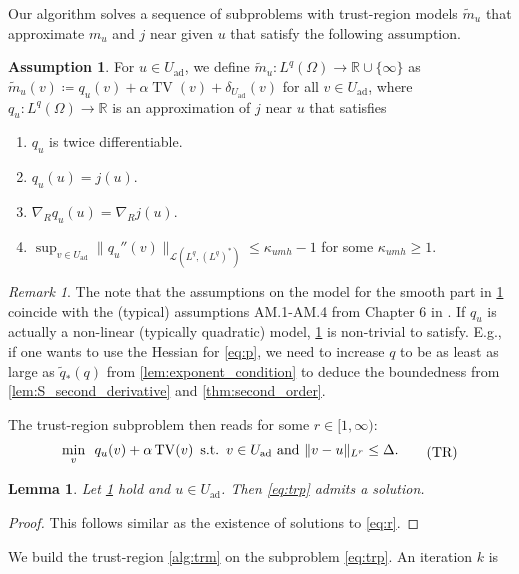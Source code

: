 \documentclass[11pt]{article}
\newcommand{\R}{\mathbb{R}}
\newcommand{\calL}{\mathcal{L}}
\DeclareMathOperator*{\TV}{TV}
\newcommand{\feas}{U_{\textrm{ad}}}
\newtheorem{lemma}[theorem]{Lemma}
\theoremstyle{definition}
\newtheorem{assumption}[theorem]{Assumption}
\theoremstyle{remark}
\newtheorem{remark}[theorem]{Remark}
\begin{document}
Our algorithm solves a sequence of subproblems with trust-region models $\tilde{m}_u$ that approximate
$m_u$ and $j$ near given $u$ that satisfy the following assumption.
%
\begin{assumption}\label{ass:trust-region_model}
For $u \in \feas$, we define $\tilde{m}_u : L^{q}(\Omega) \to \R \cup \{\infty\}$ as
$ \tilde{m}_u(v) \coloneqq q_u(v) + \alpha \TV(v) + \delta_{\feas}(v)$
for all $v \in \feas$, where $q_u : L^{q}(\Omega) \to \R$ is an approximation of $j$
near $u$ that satisfies
%
\begin{enumerate}
\item $q_u$ is twice differentiable.
\item $q_u(u) = j(u)$.
\item $\nabla_R q_u(u) = \nabla_R j(u)$.
\item\label{itm:regularity_quadratic_model}
 $\sup_{v \in \feas} \|q_u''(v)\|_{\calL(L^{q}, (L^{q})^*)} \le \kappa_{umh} - 1$
for some $\kappa_{umh} \ge 1$.
\end{enumerate}
\end{assumption}
%
\begin{remark}
The note that the assumptions on the model for the smooth part in \cref{ass:trust-region_model} coincide with
the (typical) assumptions AM.1-AM.4 from Chapter 6 in \cite{conn2000trust}. If $q_u$ is actually a
non-linear (typically quadratic) model, \cref{ass:trust-region_model} is non-trivial to satisfy.
E.g., if one wants to use the Hessian for \eqref{eq:p},
we need to increase $q$ to be as least as large as $\tilde{q}_*(q)$ from \cref{lem:exponent_condition}
to deduce the boundedness from
\cref{lem:S_second_derivative} and \cref{thm:second_order}.	
\end{remark}
%
The trust-region subproblem then reads for some $r \in [1,\infty)$:
%
\begin{gather}\label{eq:trp}
\begin{aligned}
\min_v\enskip
q_u(v) + \alpha \TV(v)
\enskip
\text{s.t.}\enskip
v \in \feas \text{ and } \|v - u\|_{L^{r}} \le \Delta.
\end{aligned}\tag{TR}
\end{gather}
%
\begin{lemma}
Let \cref{ass:trust-region_model} hold and $u \in \feas$. Then \eqref{eq:trp} admits a solution.
\end{lemma}
\begin{proof}
This follows similar as the existence of solutions to \eqref{eq:r}.
\end{proof}
%
We build the trust-region \cref{alg:trm} on the subproblem \eqref{eq:trp}. An iteration $k$ is
\end{document}
